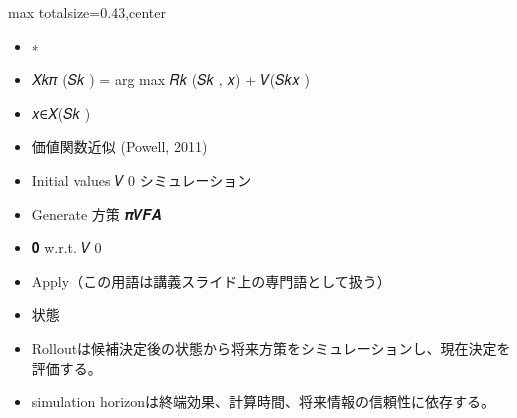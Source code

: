\clearpage
{}
\begin{minipage}[t]{0.405\textwidth}
\begin{adjustbox}{max totalsize={\textwidth}{0.43\textheight},center}
\begin{minipage}{\textwidth}\scriptsize
{}\begin{itemize}
\item ∗
\item 𝑋𝑘𝜋 (𝑆𝑘 ) = arg max 𝑅𝑘 (𝑆𝑘 , 𝑥) + 𝑉(𝑆𝑘𝑥 )
\item 𝑥∈𝑋(𝑆𝑘 )
\item 価値関数近似 (Powell, 2011)
\item Initial values 𝑉෠0 シミュレーション
\item Generate 方策 𝝅𝑽𝑭𝑨
\item 𝟎 w.r.t. 𝑉෠0
\item Apply（この用語は講義スライド上の専門語として扱う）
\item 状態
\end{itemize}\begin{itemize}
\item Rolloutは候補決定後の状態から将来方策をシミュレーションし、現在決定を評価する。
\item simulation horizonは終端効果、計算時間、将来情報の信頼性に依存する。
\end{itemize}
\end{minipage}
\end{adjustbox}
\end{minipage}\hfill
